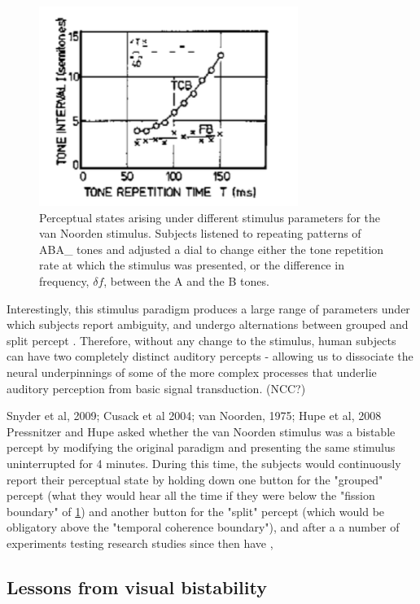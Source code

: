 \begin{figure}
	\centering
	\includegraphics[scale=1.0]{Noorden_Diagram.png}
	\caption{Perceptual states arising under different stimulus parameters for the van Noorden stimulus. Subjects listened to repeating patterns of ABA\_ tones and adjusted a dial to change either the tone repetition rate at which the stimulus was presented, or the difference in frequency, $\delta f$, between the A and the B tones.}
	\label{fig:Noorden_Diagram}
\end{figure}

Interestingly, this stimulus paradigm produces a large range of parameters under which subjects report ambiguity, and undergo alternations between grouped and split percept \cite{Pressnitzer2008}. Therefore, without any change to the stimulus, human subjects can have two completely distinct auditory percepts - allowing us to dissociate the neural underpinnings of some of the more complex processes that underlie auditory perception from basic signal transduction. (NCC?)

Snyder et al, 2009; Cusack et al 2004; van Noorden, 1975; Hupe et al, 2008
Pressnitzer and Hupe asked whether the van Noorden stimulus was a bistable percept \cite{Pressnitzer2005} by modifying the original paradigm and presenting the same stimulus uninterrupted for 4 minutes. During this time, the subjects would continuously report their perceptual state by holding down one button for the "grouped" percept (what they would hear all the time if they were below the "fission boundary" of \ref{fig:Noorden_Diagram}) and another button for the "split" percept (which would be obligatory above the "temporal coherence boundary"), and after a a number of experiments testing research studies since then have , \cite{Pressnitzer2011a}

\subsection{Lessons from visual bistability}

